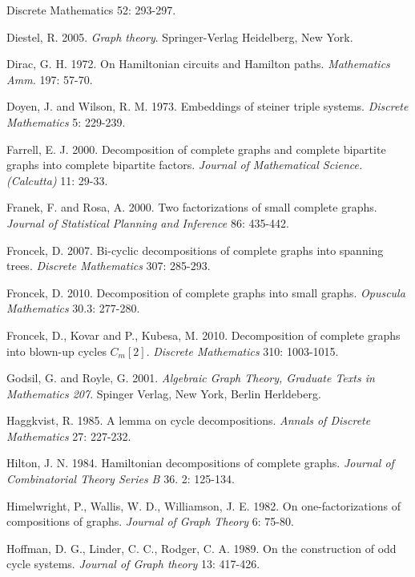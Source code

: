 \documentclass[12pt]{report}
\begin{document}
\begin{newpage}
\begin{description}
{Discrete Mathematics} 52: 293-297.
\item Diestel, R. 2005.  {\it Graph theory}. Springer-Verlag Heidelberg, New York.
\item Dirac, G. H. 1972. On Hamiltonian circuits and Hamilton paths. {\it
Mathematics Amm. }197: 57-70.
\item Doyen, J. and Wilson, R. M. 1973. Embeddings of steiner triple
systems. {\it Discrete Mathematics} 5: 229-239.
\item Farrell, E. J. 2000. Decomposition of complete graphs and complete bipartite graphs into complete bipartite factors. {\it Journal of Mathematical Science. (Calcutta)}
 11: 29-33.
\item Franek, F. and Rosa, A. 2000. Two factorizations of small complete graphs. {\it Journal of Statistical Planning and Inference} 86: 435-442.
\item Froncek, D. 2007.  Bi-cyclic decompositions of complete graphs into
spanning trees. {\it Discrete Mathematics} 307: 285-293.
\item Froncek, D. 2010. Decomposition of complete graphs into small graphs. {\it Opuscula Mathematics}
  30.3: 277-280.%
\item Froncek, D., Kovar and P., Kubesa, M. 2010. Decomposition of complete
graphs into  blown-up cycles $C_m[2]$. {\it Discrete Mathematics }
310: 1003-1015.
\item Godsil, G. and Royle, G. 2001. {\it Algebraic Graph Theory, Graduate
Texts in Mathematics 207}. Spinger Verlag, New York, Berlin
Herldeberg.
\item Haggkvist, R. 1985. A lemma on cycle decompositions. {\it Annals of
Discrete Mathematics} 27: 227-232.
\item Hilton, J. N. 1984.  Hamiltonian decompositions of complete graphs.
{\it Journal of Combinatorial Theory Series B} 36. 2: 125-134.
\item Himelwright, P., Wallis, W. D., Williamson, J. E. 1982. On
one-factorizations of compositions of graphs. {\it Journal of Graph
Theory} 6: 75-80.
\item Hoffman, D. G., Linder, C. C., Rodger, C. A. 1989. On the
construction of odd cycle systems. {\it Journal of Graph theory} 13:
417-426.

\end{description}
\end{newpage}
\end{document}
